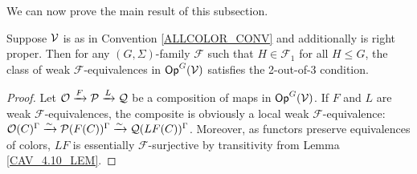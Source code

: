 \documentclass[a4paper,10pt
,draft
]{article}%
\renewcommand{\F}{\mathcal F}
\newcommand{\Q}{\mathcal Q}
\newcommand{\J}{\mathbb J}
\renewcommand{\1}{\eta}%
\begin{document}
We can now prove the main result of this subsection.
 
\begin{proposition}
      \label{CAV_4.15_PROP}
      \label{2OUTOF3_PROP}
      Suppose $\mathcal V$ is as in Convention \ref{ALLCOLOR_CONV} and additionally is right proper.
      Then for any $(G, \Sigma)$-family $\F$ such that $H \in \F_1$ for all $H \leq G$, %
      the class of weak $\F$-equivalences in $\mathsf{Op}^G(\mathcal V)$ satisfies the 2-out-of-3 condition.
\end{proposition}
\begin{proof}
      Let $\O \xrightarrow{F} \P \xrightarrow{L} \Q$ be a composition of maps in $\mathsf{Op}^G(\mathcal V)$.
      If $F$ and $L$ are weak $\F$-equivalences,
      the composite is obviously a local weak $\F$-equivalence:
      $\O(C)^\Gamma \xrightarrow{\sim} \P(F(C))^\Gamma \xrightarrow{\sim} \Q(LF(C))^\Gamma$.
      Moreover, as functors preserve equivalences of colors, $L F$ is essentially $\F$-surjective by transitivity from Lemma \ref{CAV_4.10_LEM}. 
      

\end{proof}
\end{document}
